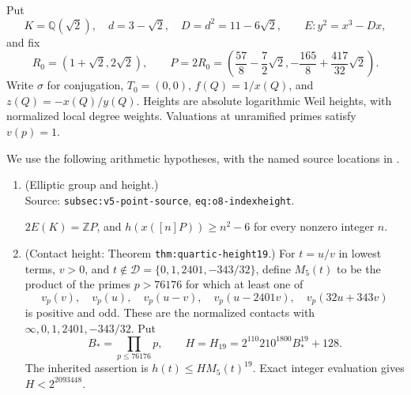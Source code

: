 \documentclass[11pt,a4paper]{article}
\theoremstyle{definition}
\theoremstyle{remark}
\begin{document}
Put
\[
 K=\mathbb Q(\sqrt2),\quad d=3-\sqrt2,\quad D=d^2=11-6\sqrt2,
 \qquad E:y^2=x^3-Dx,
\]
and fix
\[
 R_0=(1+\sqrt2,2\sqrt2),\qquad
 P=2R_0=\left(\frac{57}{8}-\frac72\sqrt2,
          -\frac{165}{8}+\frac{417}{32}\sqrt2\right).
\]
Write $\sigma$ for conjugation, $T_0=(0,0)$, $f(Q)=1/x(Q)$,
and $z(Q)=-x(Q)/y(Q)$.  Heights are absolute logarithmic Weil
heights, with normalized local degree weights.  Valuations at
unramified primes satisfy $v(p)=1$.

We use the following arithmetic hypotheses, with the named source
locations in \cite{RepositoryV9}.
\begin{enumerate}
\item (Elliptic group and height.)\\
      Source: \nolinkurl{subsec:v5-point-source}, \nolinkurl{eq:o8-indexheight}.\par $2E(K)=\mathbb ZP$, and
      $h(x([n]P))\ge n^2-6$ for every nonzero integer $n$.
\item (Contact height: Theorem \nolinkurl{thm:quartic-height19}.)
      For $t=u/v$ in lowest terms, $v>0$, and
      $t\notin\mathcal D=\{0,1,2401,-343/32\}$, define $M_5(t)$
      to be the product of the primes $p>76176$ for which at least one of
\[
 v_p(v),\quad v_p(u),\quad v_p(u-v),\quad
 v_p(u-2401v),\quad v_p(32u+343v)
\]
      is positive and odd.  These are the normalized contacts with
      $\infty,0,1,2401,-343/32$.  Put
\[
 B_* =\prod_{p\le76176}p,\qquad
 H=H_{19}=2^{110}210^{1800}B_*^{19}+128.
\]
      The inherited assertion is $h(t)\le H M_5(t)^{19}$.
      Exact integer evaluation gives $H<2^{2093448}$.


\end{enumerate}
\end{document}
